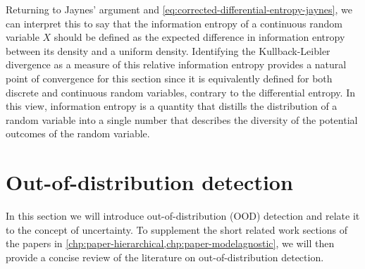 Returning to Jaynes' argument and \cref{eq:corrected-differential-entropy-jaynes}, we can interpret this to say that the information entropy of a continuous random variable $X$ should be defined as the expected difference in information entropy between its density and a uniform density. 
Identifying the Kullback-Leibler divergence as a measure of this relative information entropy provides a natural point of convergence for this section since it is equivalently defined for both discrete and continuous random variables, contrary to the differential entropy. 
In this view, information entropy is a quantity that distills the distribution of a random variable into a single number that describes the diversity of the potential outcomes of the random variable.



\section{Out-of-distribution detection} \label{sec:out-of-distribution-detection}
% 
%
%
In this section we will introduce out-of-distribution (OOD) detection and relate it to the concept of uncertainty. 
To supplement the short related work sections of the papers in \cref{chp:paper-hierarchical,chp:paper-modelagnostic}, we will then provide a concise review of the literature on out-of-distribution detection. 

